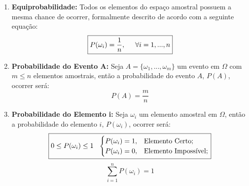 \documentclass{article}
\begin{document}
                \begin{enumerate}[noitemsep]
                    \item \textbf{Equiprobabilidade:} Todos os elementos do espaço amostral possuem a mesma chance de ocorrer, formalmente descrito de acordo com a seguinte equação:
                        \begin{equation}
                            \boxed{
                                P(\omega_{i}) = \frac{1}{n},
                                \hspace{5mm}
                                \forall i = 1, ..., n
                            }
                        \end{equation}
                    \item \textbf{Probabilidade do Evento A:} Seja $A = \{ \omega_{1}, ..., \omega_{m} \}$ um evento em $\Omega$ com $m \le n$ elementos amostrais, então a probabilidade do evento $A$, $P(A)$, ocorrer será:
                        \begin{equation}
                            \boxed{
                                P(A) = \frac{m}{n}
                            }
                        \end{equation}
                    \item \textbf{Probabilidade do Elemento i:} Seja $\omega_{i}$ um elemento amostral em $\Omega$, então a probabilidade do elemento $i$, $P(\omega_{i})$, ocorrer será:
                        \begin{equation}
                            \boxed{
                                0 \le P(\omega_{i}) \le 1
                                \hspace{2.5mm}
                                \begin{cases}
                                    P(\omega_{i}) = 1, & \text{Elemento Certo};\\
                                    P(\omega_{i}) = 0, & \text{Elemento Impossível};
                                \end{cases}
                            }
                        \end{equation}
                        \begin{equation}
                            \boxed{
                                \sum_{i=1}^{n} P(\omega_{i}) = 1
                            }
                        \end{equation}
                \end{enumerate}
\end{document}
